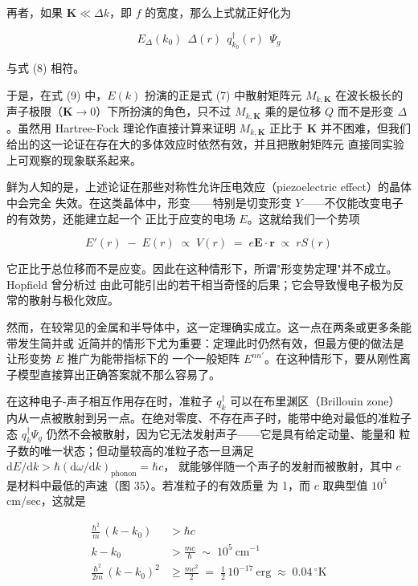 再者，如果 $\mathbf{K}\ll\Delta k$，即 $f$ 的宽度，那么上式就正好化为

\begin{equation*}
E_{\Delta}(k_{0})\;\, \Delta(r)\;\, q_{k_{0}}^{\dagger}(r)\;\, \Psi_{g}
\end{equation*}

与式 (8) 相符。

于是，在式 (9) 中，$E(k)$ 扮演的正是式 (7) 中散射矩阵元 $M_{k,\mathbf{K}}$ 在波长极长的
声子极限（$\mathbf{K}\to 0$）下所扮演的角色，只不过 $M_{k,\mathbf{K}}$ 乘的是位移 $Q$
而不是形变 $\Delta$。虽然用 Hartree-Fock 理论作直接计算来证明 $M_{k,\mathbf{K}}$ 正比于
$\mathbf{K}$ 并不困难，但我们给出的这一论证在存在大的多体效应时依然有效，并且把散射矩阵元
直接同实验上可观察的现象联系起来。

鲜为人知的是，上述论证在那些对称性允许压电效应（piezoelectric effect）的晶体中会完全
失效。在这类晶体中，形变——特别是切变形变 $Y$——不仅能改变电子的有效势，还能建立起一个
正比于应变的电场 $E$。这就给我们一个势项

\begin{equation*}
E'(r) \;-\; E(r) \;\propto\; V(r) \;=\; e\mathbf{E}\cdot\mathbf{r} \;\propto\; rS(r)
\end{equation*}

它正比于总位移而不是应变。因此在这种情形下，所谓"形变势定理"并不成立。Hopfield 曾分析过
由此可能引出的若干相当奇怪的后果；它会导致慢电子极为反常的散射与极化效应。

然而，在较常见的金属和半导体中，这一定理确实成立。这一点在两条或更多条能带发生简并或
近简并的情形下尤为重要：定理此时仍然有效，但最方便的做法是让形变势 $E$ 推广为能带指标下的
一个一般矩阵 $E^{nn'}$。在这种情形下，要从刚性离子模型直接算出正确答案就不那么容易了。

在这种电子-声子相互作用存在时，准粒子 $q_{k}^{\dagger}$ 可以在布里渊区（Brillouin zone）
内从一点被散射到另一点。在绝对零度、不存在声子时，能带中绝对最低的准粒子态
$q_{k}^{\dagger}\Psi_{g}$ 仍然不会被散射，因为它无法发射声子——它是具有给定动量、能量和
粒子数的唯一状态；但动量较高的准粒子态一旦满足
$\mathrm{d}E/\mathrm{d}k > \hbar(\mathrm{d}\omega/\mathrm{d}k)_{\text{phonon}} = \hbar c$，
就能够伴随一个声子的发射而被散射，其中 $c$ 是材料中最低的声速（图 35）。若准粒子的有效质量
为 1，而 $c$ 取典型值 $10^{5}$ cm/sec，这就是

\begin{align*}
\frac{\hbar^{2}}{m}\,(k - k_{0}) &> \hbar c \\
k - k_{0} &> \frac{mc}{\hbar} \;\sim\; 10^{5}\ \text{cm}^{-1} \\
\frac{\hbar^{2}}{2m}\,(k - k_{0})^{2} &\geq \frac{mc^{2}}{2} \;=\; \frac{1}{2}\,10^{-17}\ \text{erg} \;\approx\; 0.04\,^{\circ}\mathrm{K}
\end{align*}

